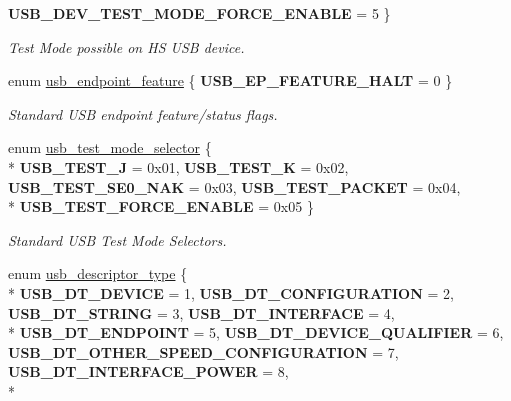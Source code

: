 \begin{DoxyCompactItemize}
{\bfseries U\-S\-B\-\_\-\-D\-E\-V\-\_\-\-T\-E\-S\-T\-\_\-\-M\-O\-D\-E\-\_\-\-F\-O\-R\-C\-E\-\_\-\-E\-N\-A\-B\-L\-E} =  5
 \}
\begin{DoxyCompactList}\small\item\em Test Mode possible on H\-S U\-S\-B device. \end{DoxyCompactList}\item 
enum \hyperlink{group__usb__protocol__group_gac46bc23132eb03cefa56ba47024ced5d}{usb\-\_\-endpoint\-\_\-feature} \{ {\bfseries U\-S\-B\-\_\-\-E\-P\-\_\-\-F\-E\-A\-T\-U\-R\-E\-\_\-\-H\-A\-L\-T} =  0
 \}
\begin{DoxyCompactList}\small\item\em Standard U\-S\-B endpoint feature/status flags. \end{DoxyCompactList}\item 
enum \hyperlink{group__usb__protocol__group_gade3fc5b71e88ed167a8c8d67ee087db3}{usb\-\_\-test\-\_\-mode\-\_\-selector} \{ \\*
{\bfseries U\-S\-B\-\_\-\-T\-E\-S\-T\-\_\-\-J} =  0x01, 
{\bfseries U\-S\-B\-\_\-\-T\-E\-S\-T\-\_\-\-K} =  0x02, 
{\bfseries U\-S\-B\-\_\-\-T\-E\-S\-T\-\_\-\-S\-E0\-\_\-\-N\-A\-K} =  0x03, 
{\bfseries U\-S\-B\-\_\-\-T\-E\-S\-T\-\_\-\-P\-A\-C\-K\-E\-T} =  0x04, 
\\*
{\bfseries U\-S\-B\-\_\-\-T\-E\-S\-T\-\_\-\-F\-O\-R\-C\-E\-\_\-\-E\-N\-A\-B\-L\-E} =  0x05
 \}
\begin{DoxyCompactList}\small\item\em Standard U\-S\-B Test Mode Selectors. \end{DoxyCompactList}\item 
enum \hyperlink{group__usb__protocol__group_ga87d46dd117d939964c939f1518dec93f}{usb\-\_\-descriptor\-\_\-type} \{ \\*
{\bfseries U\-S\-B\-\_\-\-D\-T\-\_\-\-D\-E\-V\-I\-C\-E} =  1, 
{\bfseries U\-S\-B\-\_\-\-D\-T\-\_\-\-C\-O\-N\-F\-I\-G\-U\-R\-A\-T\-I\-O\-N} =  2, 
{\bfseries U\-S\-B\-\_\-\-D\-T\-\_\-\-S\-T\-R\-I\-N\-G} =  3, 
{\bfseries U\-S\-B\-\_\-\-D\-T\-\_\-\-I\-N\-T\-E\-R\-F\-A\-C\-E} =  4, 
\\*
{\bfseries U\-S\-B\-\_\-\-D\-T\-\_\-\-E\-N\-D\-P\-O\-I\-N\-T} =  5, 
{\bfseries U\-S\-B\-\_\-\-D\-T\-\_\-\-D\-E\-V\-I\-C\-E\-\_\-\-Q\-U\-A\-L\-I\-F\-I\-E\-R} =  6, 
{\bfseries U\-S\-B\-\_\-\-D\-T\-\_\-\-O\-T\-H\-E\-R\-\_\-\-S\-P\-E\-E\-D\-\_\-\-C\-O\-N\-F\-I\-G\-U\-R\-A\-T\-I\-O\-N} =  7, 
{\bfseries U\-S\-B\-\_\-\-D\-T\-\_\-\-I\-N\-T\-E\-R\-F\-A\-C\-E\-\_\-\-P\-O\-W\-E\-R} =  8, 
\\*

\end{DoxyCompactItemize}

